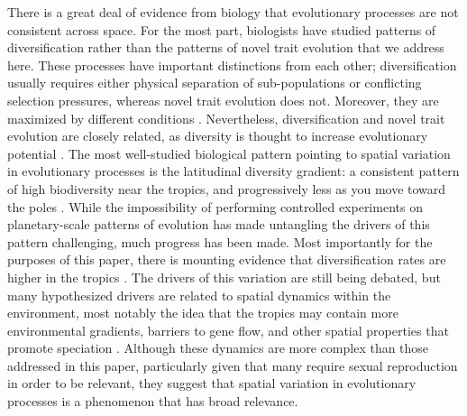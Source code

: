 There is a great deal of evidence from biology that evolutionary processes are not consistent across space. For the most part, biologists have studied patterns of diversification rather than the patterns of novel trait evolution that we address here. These processes have important distinctions from each other; diversification usually requires either physical separation of sub-populations or conflicting selection pressures, whereas novel trait evolution does not. Moreover, they are maximized by different conditions \citep{walker_evolutionary_2012}. Nevertheless, diversification and novel trait evolution are closely related, as diversity is thought to increase evolutionary potential \citep{rouzic_evolutionary_2008}. The most well-studied biological pattern pointing to spatial variation in evolutionary processes is the latitudinal diversity gradient: a consistent pattern of high biodiversity near the tropics, and progressively less as you move toward the poles \citep{hillebrand_generality_2004}. While the impossibility of performing controlled experiments on planetary-scale patterns of evolution has made untangling the drivers of this pattern challenging, much progress has been made. Most importantly for the purposes of this paper, there is mounting evidence that diversification rates are higher in the tropics \citep{mittelbach_evolution_2007}. The drivers of this variation are still being debated, but many hypothesized drivers are related to spatial dynamics within the environment, most notably the idea that the tropics may contain more environmental gradients, barriers to gene flow, and other spatial properties that promote speciation \citep{moritz_diversification_2000}. Although these dynamics are more complex than those addressed in this paper, particularly given that many require sexual reproduction in order to be relevant, they suggest that spatial variation in evolutionary processes is a phenomenon that has broad relevance.
% 
%

